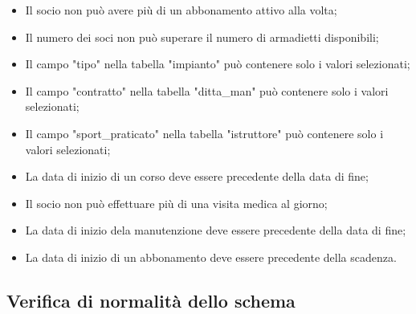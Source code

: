\documentclass{article}
\begin{document}
    \begin{itemize}
        \item Il socio non può avere più di un abbonamento attivo alla volta;
        \item Il numero dei soci non può superare il numero di armadietti disponibili;
        \item Il campo "tipo" nella tabella "impianto" può contenere solo i valori selezionati;
        \item Il campo "contratto" nella tabella "ditta\_man" può contenere solo i valori selezionati;
        \item Il campo "sport\_praticato" nella tabella "istruttore" può contenere solo i valori selezionati;
        \item La data di inizio di un corso deve essere precedente della data di fine;
        \item Il socio non può effettuare più di una visita medica al giorno;
        \item La data di inizio dela manutenzione deve essere precedente della data di fine;
        \item La data di inizio di un abbonamento deve essere precedente della scadenza.
    \end{itemize}
  
\subsection{Verifica di normalità dello schema}
\end{document}
